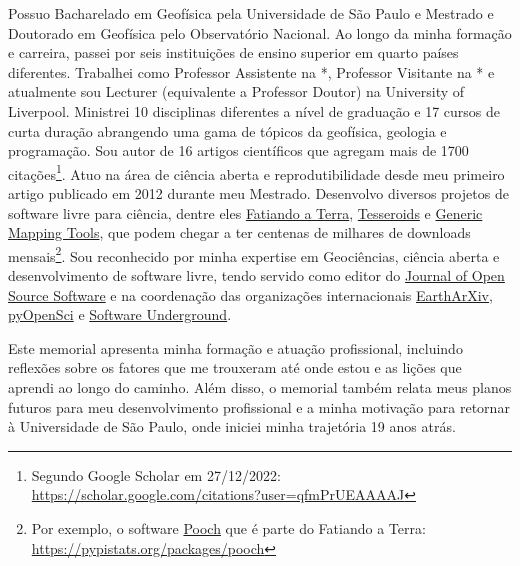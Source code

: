 \documentclass[10pt,a4paper,oneside]{book}
\begin{document}
Possuo Bacharelado em Geofísica pela Universidade de São Paulo e Mestrado
e Doutorado em Geofísica pelo Observatório Nacional.
Ao longo da minha formação e carreira, passei por seis instituições de ensino
superior em quarto países diferentes.
Trabalhei como Professor Assistente na *,
Professor Visitante na * e atualmente sou Lecturer (equivalente a
Professor Doutor) na University of Liverpool.
Ministrei 10 disciplinas diferentes a nível de graduação e 17 cursos de curta
duração abrangendo uma gama de tópicos da geofísica, geologia e programação.
Sou autor de 16 artigos científicos que agregam mais de 1700
citações\footnote{Segundo Google Scholar em 27/12/2022: \url{https://scholar.google.com/citations?user=qfmPrUEAAAAJ}}.
Atuo na área de ciência aberta e reprodutibilidade desde meu primeiro artigo
publicado em 2012 durante meu Mestrado.
Desenvolvo diversos projetos de software livre para ciência, dentre eles
\href{https://www.fatiando.org/}{Fatiando a Terra},
\href{https://tesseroids.leouieda.com}{Tesseroids}
e
\href{https://www.generic-mapping-tools.org/}{Generic Mapping Tools},
que podem chegar a ter centenas de milhares de downloads
mensais\footnote{Por exemplo, o software
\href{https://github.com/fatiando/pooch}{Pooch} que é parte do Fatiando a
Terra: \url{https://pypistats.org/packages/pooch}}.
Sou reconhecido por minha expertise em Geociências, ciência aberta e
desenvolvimento de software livre, tendo servido como editor do
\href{https://joss.theoj.org/}{Journal of Open Source Software} e na
coordenação das organizações internacionais
\href{https://eartharxiv.org/}{EarthArXiv},
\href{https://www.pyopensci.org/}{pyOpenSci}
e \href{https://softwareunderground.org}{Software Underground}.

Este memorial apresenta minha formação e atuação profissional, incluindo
reflexões sobre os fatores que me trouxeram até onde estou e as lições que
aprendi ao longo do caminho.
Além disso, o memorial também relata meus planos futuros para meu
desenvolvimento profissional e a minha motivação para retornar à Universidade
de São Paulo, onde iniciei minha trajetória 19 anos atrás.
\end{document}
